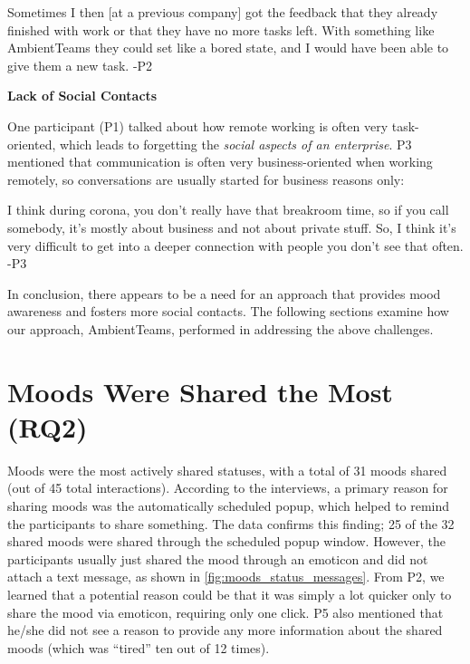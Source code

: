 \begin{displayquote}
    Sometimes I then [at a previous company] got the feedback that they already finished with work or that they have no more tasks left. With something like AmbientTeams they could set like a bored state, and I would have been able to give them a new task. -P2
\end{displayquote}

\bigskip\noindent\textbf{Lack of Social Contacts}

\medskip\noindent One participant (P1) talked about how remote working is often very task-oriented, which leads to forgetting the \textit{social aspects of an enterprise}. P3 mentioned that communication is often very business-oriented when working remotely, so conversations are usually started for business reasons only:

\begin{displayquote}
    I think during corona, you don't really have that breakroom time, so if you call somebody, it's mostly about business and not about private stuff. So, I think it's very difficult to get into a deeper connection with people you don't see that often. -P3
\end{displayquote}

In conclusion, there appears to be a need for an approach that provides mood awareness and fosters more social contacts. The following sections examine how our approach, AmbientTeams, performed in addressing the above challenges.

\section{Moods Were Shared the Most (RQ2)}
\label{section:moods_were_shared_the_most}
Moods were the most actively shared statuses, with a total of 31 moods shared (out of 45 total interactions). According to the interviews, a primary reason for sharing moods was the automatically scheduled popup, which helped to remind the participants to share something. The data confirms this finding; 25 of the 32 shared moods were shared through the scheduled popup window. However, the participants usually just shared the mood through an emoticon and did not attach a text message, as shown in \autoref{fig:moods_status_messages}. From P2, we learned that a potential reason could be that it was simply a lot quicker only to share the mood via emoticon, requiring only one click. P5 also mentioned that he/she did not see a reason to provide any more information about the shared moods (which was \enquote{tired} ten out of 12 times).

